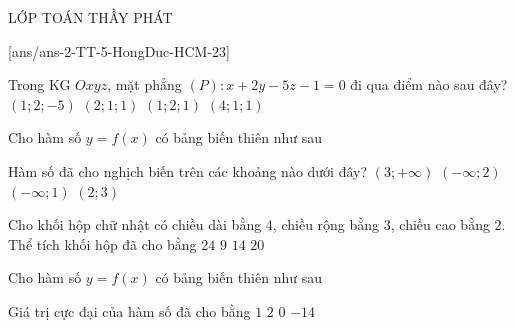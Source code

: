 \begin{name}
	{\tenchude}{\tendethi}{LỚP TOÁN THẦY PHÁT}{\thoigian}
\end{name}
\setcounter{ex}{0}\setcounter{bt}{0}
[ans/ans-2-TT-5-HongDuc-HCM-23]
\begin{ex}%
	Trong KG $Oxyz$, mặt phẳng $(P)\colon x+2y-5z-1=0$ đi qua điểm nào sau đây?
	\choice
	{$(1;2;-5)$}
	{$(2;1;1)$}
	{$(1;2;1)$}
	{\True $(4;1;1)$}
\end{ex}

\begin{ex}%
	Cho hàm số $y=f(x)$ có bảng biến thiên như sau
\begin{center}
\end{center}
Hàm số đã cho nghịch biến trên các khoảng nào dưới đây?
	\choice
	{$(3;+\infty)$}
	{$(-\infty;2)$}
	{$(-\infty;1)$}
	{\True $(2;3)$}
\end{ex}

\begin{ex}%
Cho khối hộp chữ nhật có chiều dài bằng $4$, chiều rộng bằng $3$, chiều cao bằng $2$. Thể tích khối hộp đã cho bằng 	
	\choice
	{\True $24$}
	{$9$}
	{$14$}
	{$20$}
\end{ex}

\begin{ex}%
	Cho hàm số $y=f(x)$ có bảng biến thiên như sau
\begin{center}
\end{center}
Giá trị cực đại của hàm số đã cho bằng	
	\choice
	{$1$}
	{\True $2$}
	{$0$}
	{$-14$}
\end{ex}

